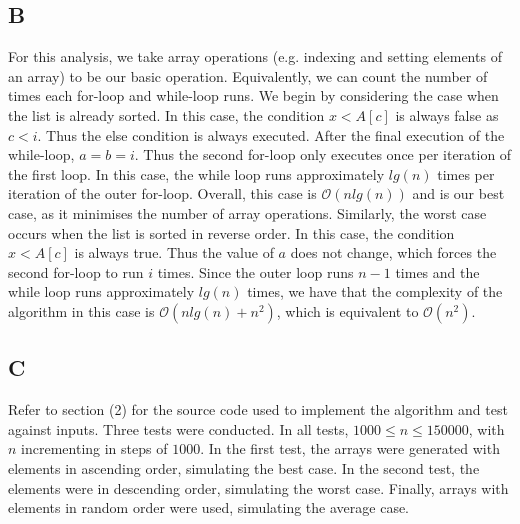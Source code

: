 \documentclass[a4paper]{article}
\begin{document}
\subsection{B}
For this analysis, we take array operations (e.g. indexing and setting elements of an array) to be our basic operation. Equivalently, we can count the number of times each for-loop and while-loop runs.
\newline
We begin by considering the case when the list is already sorted. In this case, the condition $x<A[c]$ is always false as $c<i$. Thus the else condition is always executed. After the final execution of the while-loop, $a=b=i$. Thus the second for-loop only executes once per iteration of the first loop. In this case, the while loop runs approximately $lg(n)$ times per iteration of the outer for-loop. Overall, this case is $\mathcal{O}(nlg(n))$ and is our best case, as it minimises the number of array operations.
\newline
Similarly, the worst case occurs when the list is sorted in reverse order. In this case, the condition $x<A[c]$ is always true. Thus the value of $a$ does not change, which forces the second for-loop to run $i$ times. Since the outer loop runs $n-1$ times and the while loop runs approximately $lg(n)$ times, we have that the complexity of the algorithm in this case is $\mathcal{O}(nlg(n)+n^2)$, which is equivalent to $\mathcal{O}(n^2)$.
\subsection{C}
Refer to section (2) for the source code used to implement the algorithm and test against inputs.
\newline
Three tests were conducted. In all tests, $1000 \leq n \leq 150000$, with $n$ incrementing in steps of $1000$. In the first test, the arrays were generated with elements in ascending order, simulating the best case. In the second test, the elements were in descending order, simulating the worst case. Finally, arrays with elements in random order were used, simulating the average case.
\end{document}
